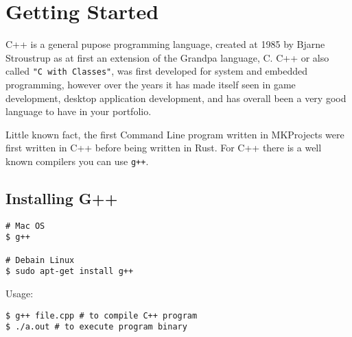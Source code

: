 \chapter{Getting Started}

C++ is a general pupose programming language, created at 1985 by Bjarne Stroustrup as at first an extension
of the Grandpa language, C. C++ or also called \verb!"C with Classes"!, was first developed for system and embedded
programming, however over the years it has made itself seen in game development, desktop application development, 
and has overall been a very good language to have in your portfolio.  

Little known fact, the first Command Line program written in MKProjects were first written in C++ before being 
written in Rust. For C++ there is a well known compilers you can use \verb!g++!. 

\section{Installing G++}
\begin{verbatim}
# Mac OS
$ g++

# Debain Linux
$ sudo apt-get install g++
\end{verbatim}

Usage: 

\begin{verbatim}
$ g++ file.cpp # to compile C++ program 
$ ./a.out # to execute program binary 
\end{verbatim}